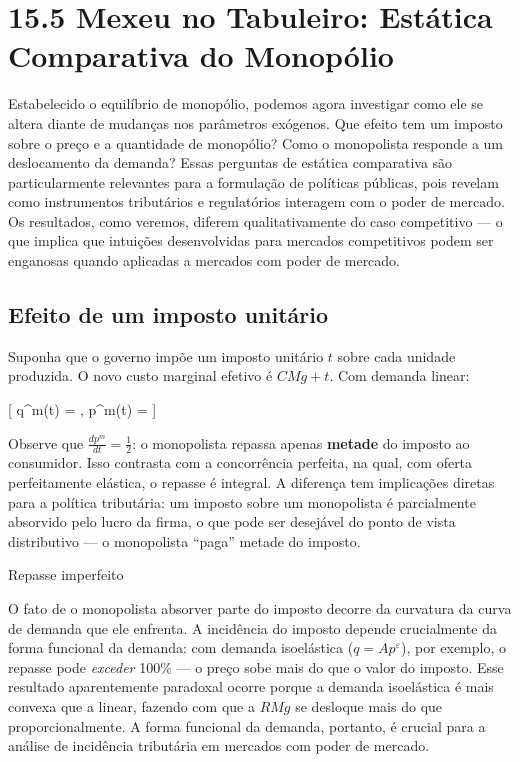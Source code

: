 \documentclass[11pt,twoside,openright]{book}
\begin{document}
\section{15.5 Mexeu no Tabuleiro: Estática Comparativa do
Monopólio}\label{155}

Estabelecido o equilíbrio de monopólio, podemos agora investigar como
ele se altera diante de mudanças nos parâmetros exógenos. Que efeito tem
um imposto sobre o preço e a quantidade de monopólio? Como o monopolista
responde a um deslocamento da demanda? Essas perguntas de estática
comparativa são particularmente relevantes para a formulação de
políticas públicas, pois revelam como instrumentos tributários e
regulatórios interagem com o poder de mercado. Os resultados, como
veremos, diferem qualitativamente do caso competitivo --- o que implica
que intuições desenvolvidas para mercados competitivos podem ser
enganosas quando aplicadas a mercados com poder de mercado.

\subsection{Efeito de um imposto
unitário}\label{efeito-de-um-imposto-unituxe1rio}

Suponha que o governo impõe um imposto unitário \(t\) sobre cada unidade
produzida. O novo custo marginal efetivo é \(CMg + t\). Com demanda
linear:

{[} q\^{}m(t) = , \quad p\^{}m(t) =
 \label{eq:15.10}  {]}

Observe que \(\frac{dp^m}{dt} = \frac{1}{2}\): o monopolista repassa
apenas \textbf{metade} do imposto ao consumidor. Isso contrasta com a
concorrência perfeita, na qual, com oferta perfeitamente elástica, o
repasse é integral. A diferença tem implicações diretas para a política
tributária: um imposto sobre um monopolista é parcialmente absorvido
pelo lucro da firma, o que pode ser desejável do ponto de vista
distributivo --- o monopolista ``paga'' metade do imposto.

\begin{notebox}{Repasse imperfeito}

O fato de o monopolista absorver parte do imposto decorre da curvatura
da curva de demanda que ele enfrenta. A incidência do imposto depende
crucialmente da forma funcional da demanda: com demanda isoelástica
(\(q = Ap^{\varepsilon}\)), por exemplo, o repasse pode \emph{exceder}
100\% --- o preço sobe mais do que o valor do imposto. Esse resultado
aparentemente paradoxal ocorre porque a demanda isoelástica é mais
convexa que a linear, fazendo com que a \(RMg\) se desloque mais do que
proporcionalmente. A forma funcional da demanda, portanto, é crucial
para a análise de incidência tributária em mercados com poder de
mercado.

\end{notebox}
\end{document}
